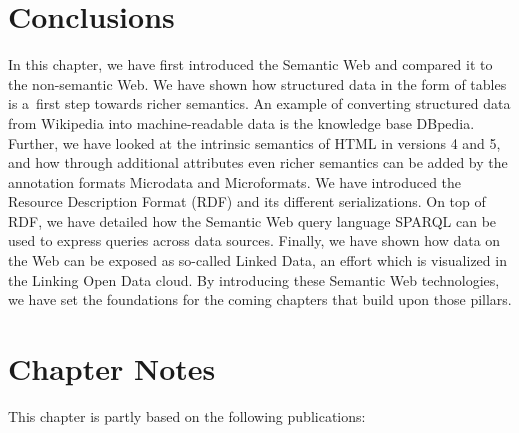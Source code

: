 \section{Conclusions}

In this chapter, we have first introduced the Semantic Web
and compared it to the non-semantic Web.
We have shown how structured data in the form of tables
is a~first step towards richer semantics.
An example of converting structured data from Wikipedia
into machine-readable data is the knowledge base DBpedia.
Further, we have looked at the intrinsic semantics
of HTML in versions 4 and 5,
and how through additional attributes
even richer semantics can be added
by the annotation formats Microdata and Microformats.
We have introduced the Resource Description Format (RDF)
and its different serializations.
On top of RDF, we have detailed
how the Semantic Web query language SPARQL
can be used to express queries across data sources.
Finally, we have shown how data on the Web
can be exposed as so-called Linked Data,
an effort which is visualized in the Linking Open Data cloud.
By introducing these Semantic Web technologies,
we have set the foundations for the coming chapters
that build upon those pillars.

\section*{Chapter Notes}
This chapter is partly based on the following publications:


\clearpage

